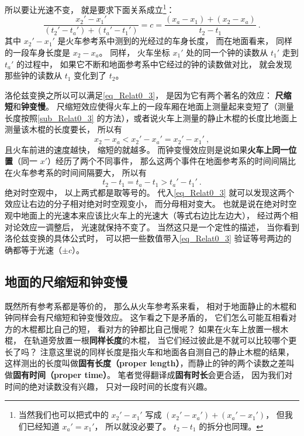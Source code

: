 所以要让光速不变， 就是要求下面关系成立\footnote{当然我们也可以把式中的 $x_2' - x_1'$ 写成 $(x_2'-x_a') + (x_a'-x_1')$， 但我们已经知道 $x_a'=x_1'$， 所以就没必要了。 $t_2-t_1$ 的拆分也同理。}：
\begin{equation} \label{eq_Relat0_3}
\frac{x_2' - x_1'}{(t_2' - t_a') + (t_a' - t_1')} = c = \frac{(x_a - x_1) + (x_2 - x_a)}{t_2 - t_1}~.
\end{equation}
其中 $x_2' - x_1'$ 是火车参考系中测到的光经过的车身长度， 而在地面看来， 同样的一段车身长度是 $x_2 - x_a$。 同样， 火车坐标 $x_1'$ 处的同一个钟的读数从 $t_1'$ 走到 $t_a'$ 的过程中， 如果它不断和地面参考系中它经过的钟的读数做对比， 就会发现那些钟的读数从 $t_1$ 变化到了 $t_2$。

洛伦兹变换之所以可以满足\autoref{eq_Relat0_3}， 是因为它有两个著名的效应： \textbf{尺缩短}和\textbf{钟变慢}。 尺缩短效应使得火车上的一段车厢在地面上测量起来变短了（测量长度按照\autoref{sub_Relat0_3} 的方法），或者说火车上测量的静止木棍的长度比地面上测量该木棍的长度要长， 所以有
\begin{equation}
x_2 - x_a < x_2'-x_a' = x_2' - x_1'~,
\end{equation}
且火车前进的速度越快， 缩短的就越多。 而钟变慢效应则是说如果\textbf{火车上同一位置}（同一 $x'$）经历了两个不同事件， 那么这两个事件在地面参考系的时间间隔比在火车参考系的时间间隔要大， 所以有
\begin{equation}
t_2 - t_1 = t_a - t_1 > t_a' - t_1'~.
\end{equation}
绝对时空观中， 以上两式都是取等号的。 代入\autoref{eq_Relat0_3} 就可以发现这两个效应让右边的分子相对绝对时空观变小， 而分母相对变大。 也就是说在绝对时空观中地面上的光速本来应该比火车上的光速大（等式右边比左边大）， 经过两个相对论效应一调整后， 光速就保持不变了。 当然这只是一个定性的描述， 当你看到洛伦兹变换的具体公式时， 可以把一些数值带入\autoref{eq_Relat0_3} 验证等号两边的确都等于光速（$\pm c$）。

\subsection{地面的尺缩短和钟变慢}
既然所有参考系都是等价的， 那么从火车参考系来看， 相对于地面静止的木棍和钟同样会有尺缩短和钟变慢效应。 这乍看之下是矛盾的， 它们怎么可能互相看对方的木棍都比自己的短， 看对方的钟都比自己慢呢？ 如果在火车上放置一根木棍， 在轨道旁放置一根\textbf{同样长度}的木棍， 当它们经过彼此是不就可以比较哪个更长了吗？ 注意这里说的同样长度是指火车和地面各自测自己的静止木棍的结果， 这样测出的长度叫做\textbf{固有长度（proper length）}，而静止的钟的两个读数之差叫做\textbf{固有时间（proper time）}。 笔者觉得翻译成\textbf{固有时长}会更合适， 因为我们对时间的绝对读数没有兴趣， 只对一段时间的长度有兴趣。


